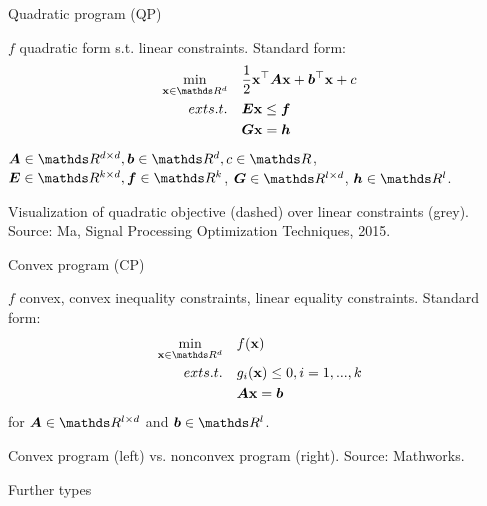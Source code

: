 \documentclass[11pt,compress,t,notes=noshow, xcolor=table]{beamer}
\begin{document}
\begin{framei}{Quadratic program (QP)}
\item $f$ quadratic form s.t. linear constraints. Standard form:
$$
\begin{aligned}
\min_{\xv \in \R^d} \quad & \frac{1}{2} \xv^\top \bm{A} \xv + \bm{b}^\top \xv + c \\
ext{s.t. } \quad & \bm{E}\xv \le \bm{f} \\
& \bm{G}\xv = \bm{h}
\end{aligned}
$$
$\bm{A} \in \R^{d \times d}, \bm{b} \in \R^d, c \in \R$, $\bm{E} \in \R^{k \times d}, \bm{f} \in \R^k$, $\bm{G} \in \R^{l \times d}$, $\bm{h} \in \R^l$.

\vfill

\begin{footnotesize}
Visualization of quadratic objective (dashed) over linear constraints (grey). Source: Ma, Signal Processing Optimization Techniques, 2015.
\end{footnotesize}
\end{framei}

\begin{framei}{Convex program (CP)}
\item $f$ convex, convex inequality constraints, linear equality constraints. Standard form:
$$
\begin{aligned}
\min_{\xv \in \R^d} \quad & \fx \\
ext{s.t. } \quad & g_i(\xv) \le 0, i = 1, ..., k \\
& \bm{A}\xv = \bm{b}
\end{aligned}
$$
for $\bm{A} \in \R^{l \times d}$ and $\bm{b} \in \R^l$.

\vfill

\begin{footnotesize}
Convex program (left) vs. nonconvex program (right). Source: Mathworks.
\end{footnotesize}
\end{framei}


\begin{frame2}{Further types}
\end{frame2}
\end{document}
